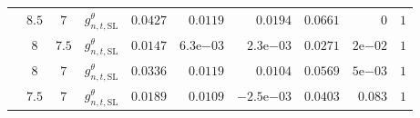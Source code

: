 \begin{longtable}{@{}p{2.55cm}cccrrrrrr@{}}
 & $8.5$ & $7$ & $g^\theta_{n,t,\mathrm{SL}}$ & $0.0427$ & $0.0119$ & $0.0194$ & $0.0661$ & $0$ & $1$\\
 & $8$ & $7.5$ & $g^\theta_{n,t,\mathrm{SL}}$ & $0.0147$ & $6.3\mathrm e{-03}$ & $2.3\mathrm e{-03}$ & $0.0271$ & $2\mathrm e{-02}$ & $1$\\
 & $8$ & $7$ & $g^\theta_{n,t,\mathrm{SL}}$ & $0.0336$ & $0.0119$ & $0.0104$ & $0.0569$ & $5\mathrm e{-03}$ & $1$\\
 & $7.5$ & $7$ & $g^\theta_{n,t,\mathrm{SL}}$ & $0.0189$ & $0.0109$ & $-2.5\mathrm e{-03}$ & $0.0403$ & $0.083$ & $1$\\
\end{longtable}
\endgroup
{}\par

